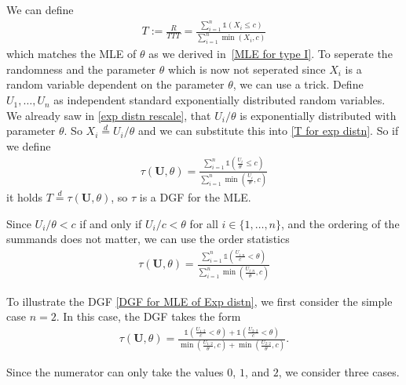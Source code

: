 We can define 
\begin{align} \label{T for exp distn}
	T 
	:= 
	\frac{R}{TTT} = \frac{
	\sum_{i = 1}^n \mathds{1}(X_i \leq c)
	}{
	\sum_{i = 1}^n \min(X_i, c)}
\end{align}
which matches the MLE of $\theta$ as we derived in~\eqref{MLE for type I}.
To seperate the randomness and the parameter $\theta$ which is now not seperated since $X_i$ is a random variable dependent on the parameter $\theta$, we can use a trick. Define $U_1, \ldots , U_n $ as independent standard exponentially distributed random variables. 
We already saw in \eqref{exp distn rescale}, that $U_i / \theta$ is exponentially distributed with parameter $\theta$. So $X_i \overset{d}{=} U_i / \theta$ and we can substitute this into \eqref{T for exp distn}. 
So if we define 
\begin{align}
	\tau(\mathbf U, \theta)
	= 
	\frac{
	\sum_{i = 1}^n \mathds{1}\left(\frac{U_i}{\theta} \leq c \right)
	}{
	\sum_{i = 1}^n \min \left(\frac{U_i}{\theta}, c \right)}
\end{align}
it holds $T \overset{d}{=} \tau(\mathbf U, \theta)$, so $\tau$ is a DGF for the MLE.


Since $U_i / \theta < c$ if and only if $U_i / c < \theta$ for all $i \in \{1, \ldots , n\}$, and the ordering of the summands does not matter, we can use the order statistics
\begin{align} 	\label{DGF for MLE of Exp distn}
	\tau(\mathbf U, \theta) = \frac
	{
		\sum_{i = 1}^n  \mathds{1} \left( \frac{U_{i:n}}{c} < \theta \right)
	}{
		\sum_{i = 1}^n \min \left(  \frac{U_{i:n}}{\theta} , c \right)
	}
\end{align}


To illustrate the DGF \eqref{DGF for MLE of Exp distn}, we first consider the simple case $n = 2$. In this case, the DGF takes the form
\begin{align} \label{dgf for n = 2}
	\tau (\mathbf U, \theta)
	=
	\frac
	{
		\mathds{1} \left( \frac{U_{1:2}}{c} < \theta \right)
		+
		\mathds{1} \left( \frac{U_{2:2}}{c} < \theta \right)
	}{
		\min \left(  \frac{U_{1:2}}{\theta} , c \right)
		+
		\min \left(  \frac{U_{2:2}}{\theta} , c \right)
	}. 	
\end{align}



Since the numerator can only take the values $0$, $1$, and $2$, we consider three cases.


